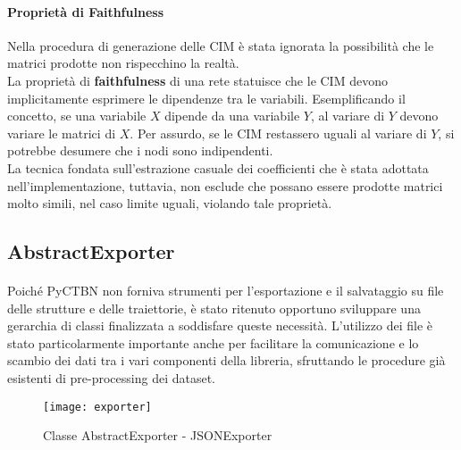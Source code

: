   \paragraph{Proprietà di Faithfulness}
  Nella procedura di generazione delle CIM è stata ignorata la possibilità che le matrici prodotte non
  rispecchino la realtà.\\
  La proprietà di \textbf{faithfulness} di una rete statuisce che le CIM devono implicitamente esprimere le dipendenze tra le variabili.
  Esemplificando il concetto, se una variabile $X$ dipende da una variabile $Y$, al variare di $Y$ devono variare le matrici di $X$.
  Per assurdo, se le CIM restassero uguali al variare di $Y$, si potrebbe desumere che i nodi sono indipendenti.\\ 
  La tecnica fondata sull'estrazione casuale dei coefficienti che è stata adottata nell'implementazione, tuttavia, non esclude che 
  possano essere prodotte matrici molto simili, nel caso limite uguali, violando tale proprietà.

  \subsection{AbstractExporter}
  \paragraph{}
  Poiché PyCTBN non forniva strumenti per l'esportazione e il salvataggio su file delle strutture
  e delle traiettorie, è stato ritenuto opportuno sviluppare una gerarchia di classi finalizzata
  a soddisfare queste necessità. L'utilizzo dei file è stato particolarmente importante anche per
  facilitare la comunicazione e lo scambio dei dati tra i vari componenti della libreria,
  sfruttando le procedure già esistenti di pre-processing dei dataset.

  \begin{figure}[H]
    \texttt{[image: exporter]}
    \centering
    \caption{Classe AbstractExporter - JSONExporter}
  \end{figure}

